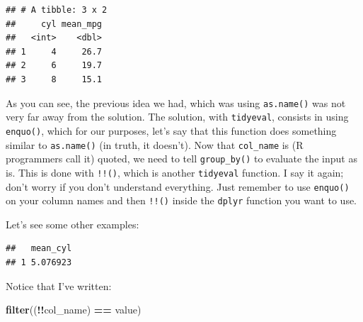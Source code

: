 \documentclass[]{gitbook}
\newenvironment{Shaded}{\begin{snugshade}}{\end{snugshade}}
\newcommand{\ControlFlowTok}[1]{\textcolor[rgb]{0.13,0.29,0.53}{\textbf{#1}}}
\newcommand{\DataTypeTok}[1]{\textcolor[rgb]{0.13,0.29,0.53}{#1}}
\newcommand{\DecValTok}[1]{\textcolor[rgb]{0.00,0.00,0.81}{#1}}
\newcommand{\KeywordTok}[1]{\textcolor[rgb]{0.13,0.29,0.53}{\textbf{#1}}}
\newcommand{\NormalTok}[1]{#1}
\newcommand{\OperatorTok}[1]{\textcolor[rgb]{0.81,0.36,0.00}{\textbf{#1}}}
\newcommand{\StringTok}[1]{\textcolor[rgb]{0.31,0.60,0.02}{#1}}
\theoremstyle{definition}
\theoremstyle{definition}
\theoremstyle{definition}
\theoremstyle{remark}
\begin{document}
\begin{verbatim}
## # A tibble: 3 x 2
##     cyl mean_mpg
##   <int>    <dbl>
## 1     4     26.7
## 2     6     19.7
## 3     8     15.1
\end{verbatim}

As you can see, the previous idea we had, which was using
\texttt{as.name()} was not very far away from the solution. The
solution, with \texttt{tidyeval}, consists in using \texttt{enquo()},
which for our purposes, let's say that this function does something
similar to \texttt{as.name()} (in truth, it doesn't). Now that
\texttt{col\_name} is (R programmers call it) quoted, we need to tell
\texttt{group\_by()} to evaluate the input as is. This is done with
\texttt{!!()}, which is another \texttt{tidyeval} function. I say it
again; don't worry if you don't understand everything. Just remember to
use \texttt{enquo()} on your column names and then \texttt{!!()} inside
the \texttt{dplyr} function you want to use.

Let's see some other examples:

\begin{Shaded}
\end{Shaded}

\begin{verbatim}
##   mean_cyl
## 1 5.076923
\end{verbatim}

Notice that I've written:

\begin{Shaded}
\begin{Highlighting}[]
\KeywordTok{filter}\NormalTok{((}\OperatorTok{!!}\NormalTok{col_name) }\OperatorTok{==}\StringTok{ }\NormalTok{value)}
\end{Highlighting}
\end{Shaded}
\end{document}
